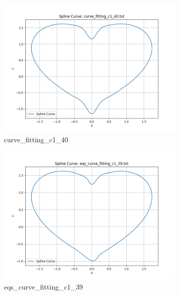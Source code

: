 \documentclass[a4paper]{article}
\begin{document}
\begin{figure}[htbp]
  \begin{subfigure}[t]{0.24\textwidth}
      \centering
      \includegraphics[width=\textwidth]{figures/E/curve_fitting_c1_40.png}
      \caption*{curve\_fitting\_c1\_40}
  \end{subfigure}
  \begin{subfigure}[t]{0.24\textwidth}
      \centering
      \includegraphics[width=\textwidth]{figures/E/eqs_curve_fitting_c1_39.png}
      \caption*{eqs\_curve\_fitting\_c1\_39}
  \end{subfigure}
  \begin{subfigure}[t]{0.24\textwidth}
      \centering

\end{subfigure}
\end{figure}
\end{document}
